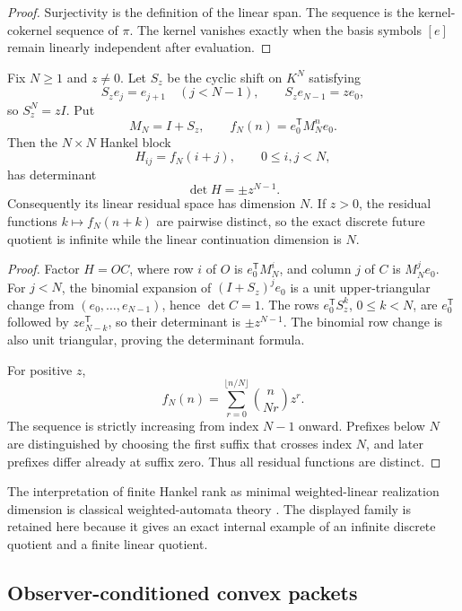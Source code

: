 \begin{proof}
Surjectivity is the definition of the linear span.  The sequence is the kernel-cokernel sequence of \(\pi\).  The kernel vanishes exactly when the basis symbols \([e]\) remain linearly independent after evaluation.
\end{proof}

\begin{theorem}
\label{thm:block18-polyphase-hankel-separation}
Fix \(N\geq1\) and \(z\neq0\).  Let \(S_z\) be the cyclic shift on \(K^N\) satisfying
\[
 S_z e_j=e_{j+1}\quad(j<N-1),
 \qquad
 S_z e_{N-1}=z e_0,
\]
so \(S_z^N=zI\).  Put
\[
 M_N=I+S_z,
 \qquad
 f_N(n)=e_0^{\mathsf T}M_N^n e_0.
\]
Then the \(N\times N\) Hankel block
\[
 H_{ij}=f_N(i+j),
 \qquad 0\leq i,j<N,
\]
has determinant
\[
 \det H=\pm z^{N-1}.
\]
Consequently its linear residual space has dimension \(N\).  If \(z>0\), the residual functions \(k\mapsto f_N(n+k)\) are pairwise distinct, so the exact discrete future quotient is infinite while the linear continuation dimension is \(N\).
\end{theorem}

\begin{proof}
Factor \(H=OC\), where row \(i\) of \(O\) is \(e_0^{\mathsf T}M_N^i\), and column \(j\) of \(C\) is \(M_N^j e_0\).  For \(j<N\), the binomial expansion of \((I+S_z)^j e_0\) is a unit upper-triangular change from \((e_0,\ldots,e_{N-1})\), hence \(\det C=1\).  The rows \(e_0^{\mathsf T}S_z^k\), \(0\leq k<N\), are \(e_0^{\mathsf T}\) followed by \(z e_{N-k}^{\mathsf T}\), so their determinant is \(\pm z^{N-1}\).  The binomial row change is also unit triangular, proving the determinant formula.

For positive \(z\),
\[
 f_N(n)=\sum_{r=0}^{\lfloor n/N\rfloor}\binom n{Nr}z^r.
\]
The sequence is strictly increasing from index \(N-1\) onward.  Prefixes below \(N\) are distinguished by choosing the first suffix that crosses index \(N\), and later prefixes differ already at suffix zero.  Thus all residual functions are distinct.
\end{proof}

The interpretation of finite Hankel rank as minimal weighted-linear realization dimension is classical weighted-automata theory \cite{CarlylePaz1971,LiRabusseauPrecup2018}.  The displayed family is retained here because it gives an exact internal example of an infinite discrete quotient and a finite linear quotient.

\subsection{Observer-conditioned convex packets}
\label{subsec:block18-convex-provenance}

